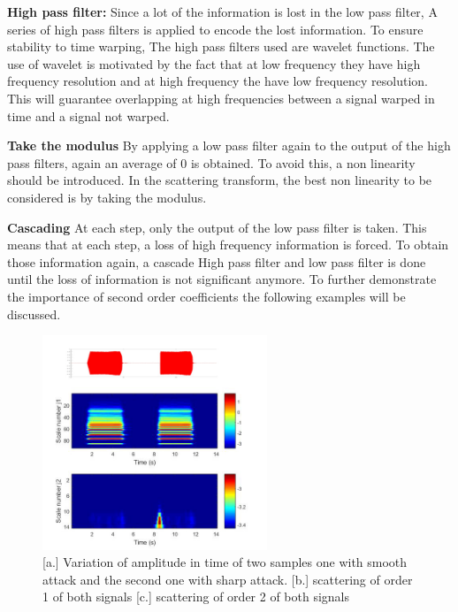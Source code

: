 \documentclass[hidelinks,12pt]{report}
\begin{document}
\textbf{High pass filter:}
Since a lot of the information is lost in the low pass filter, A series of high pass filters is applied to encode the lost information. To ensure stability to time warping, The high pass filters used are wavelet functions. The use of wavelet is motivated by the fact that at low frequency they have high frequency resolution and at high frequency the have low frequency resolution. This will guarantee overlapping at high frequencies between a signal warped in time and a signal not warped.\par
\textbf{Take the modulus}
By applying a low pass filter again to the output of the high pass filters, again an average of 0 is obtained. To avoid this, a non linearity should be introduced. In the scattering transform, the best non linearity to be considered is by taking the modulus.\par
\textbf{Cascading}
At each step, only the output of the low pass filter is taken. This means that at each step, a loss of high frequency information is forced. To obtain those information again, a cascade High pass filter and low pass filter is done until the loss of information is not significant anymore. To further demonstrate the importance of second order coefficients the following examples will be discussed.\par
\begin{figure}[t!]
  
  \centering
	    \includegraphics[width=0.6\textwidth]{att}
    \caption{[a.] Variation of amplitude in time of two samples one with smooth attack and the second one with sharp attack. [b.] scattering of order 1 of both signals [c.] scattering of order 2 of both signals }
    \label{attack}
\end{figure}
\end{document}
